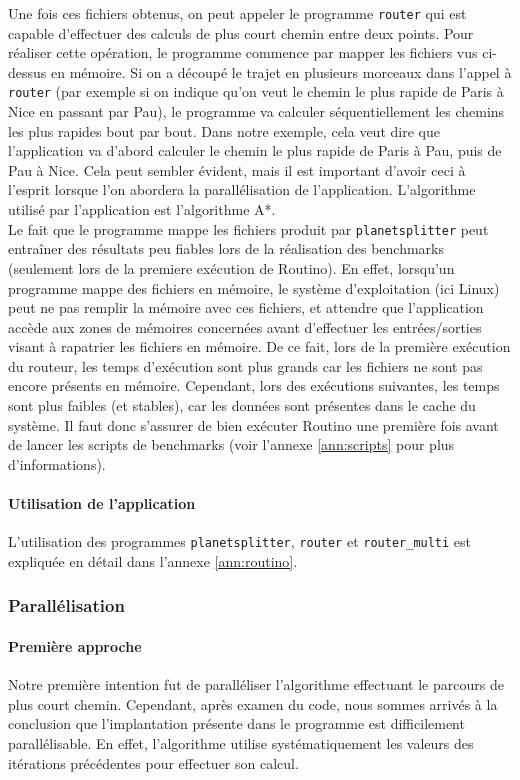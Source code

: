 Une fois ces fichiers obtenus, on peut appeler le programme \texttt{router} qui 
est capable d'effectuer des calculs de plus court chemin entre deux points. 
Pour réaliser cette opération, le programme commence par mapper les fichiers 
vus ci-dessus en mémoire. Si on a découpé le trajet en plusieurs morceaux dans
l'appel à \texttt{router} (par exemple si on indique qu'on veut le chemin le 
plus rapide de Paris à Nice en passant par Pau), le programme va calculer 
séquentiellement les chemins les plus rapides bout par bout. Dans notre exemple,
cela veut dire que l'application va d'abord calculer le chemin le plus rapide de 
Paris à Pau, puis de Pau à Nice. Cela peut sembler évident, mais il est 
important d'avoir ceci à l'esprit lorsque l'on abordera la parallélisation de 
l'application. L'algorithme utilisé par l'application est l'algorithme A*. \\

Le fait que le programme mappe les fichiers produit par \texttt{planetsplitter} 
peut entraîner des résultats peu fiables lors de la réalisation des benchmarks
(seulement lors de la premiere exécution de Routino). En effet, lorsqu'un 
programme mappe des fichiers en mémoire, le système d'exploitation (ici Linux) 
peut ne pas remplir la mémoire avec ces fichiers, et attendre que l'application 
accède aux zones de mémoires concernées avant d'effectuer les entrées/sorties 
visant à rapatrier les fichiers en mémoire. De ce fait, lors de la première 
exécution du routeur, les temps d'exécution sont plus grands car les fichiers 
ne sont pas encore présents en mémoire. Cependant, lors des exécutions suivantes,
les temps sont plus faibles (et stables), car les données sont présentes dans le
cache du système. Il faut donc s'assurer de bien exécuter Routino une première 
fois avant de lancer les scripts de benchmarks (voir l'annexe \ref{ann:scripts}
pour plus d'informations). 
 
\paragraph{Utilisation de l'application}
L'utilisation des programmes \texttt{planetsplitter}, \texttt{router} et 
\texttt{router\_multi} est expliquée en détail dans l'annexe \ref{ann:routino}.

\subsubsection{Parallélisation}
\paragraph{Première approche}
Notre première intention fut de paralléliser l'algorithme effectuant le parcours
de plus court chemin. Cependant, après examen du code, nous sommes arrivés 
à la conclusion que l'implantation présente dans le programme est difficilement
parallélisable. En effet, l'algorithme utilise systématiquement les valeurs 
des itérations précédentes pour effectuer son calcul.

